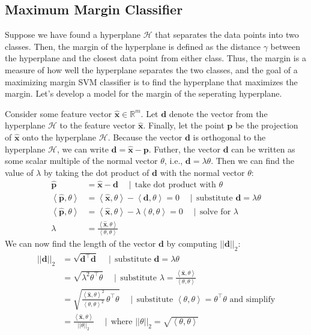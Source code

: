\documentclass{article}[11pt]
\def\R{\mathbb{R}}
\newcommand{\norm}[1]{\left|\left|#1\right|\right|}
\begin{document}
\subsection{Maximum Margin Classifier}
Suppose we have found a hyperplane $\mathcal{H}$ that separates the data points into two classes.
Then, the margin of the hyperplane is defined as the distance $\gamma$ between the hyperplane and the closest data point from either class.
Thus, the margin is a measure of how well the hyperplane separates the two classes, and the goal of a maximizing margin SVM classifier is to find the hyperplane that maximizes the margin.
Let's develop a model for the margin of the seperating hyperplane.

Consider some feature vector $\hat{\mathbf{x}} \in \R^{m}$. Let $\mathbf{d}$ denote the vector from the hyperplane $\mathcal{H}$ to the feature vector $\hat{\mathbf{x}}$.
Finally, let the point $\mathbf{p}$ be the projection of $\hat{\mathbf{x}}$ onto the hyperplane $\mathcal{H}$.
Because the vector $\mathbf{d}$ is orthogonal to the hyperplane $\mathcal{H}$, we can write $\mathbf{d} = \hat{\mathbf{x}} - \mathbf{p}$.
Futher, the vector $\mathbf{d}$ can be written as some scalar multiple of the normal vector $\theta$, i.e., $\mathbf{d} = \lambda \theta$.
Then we can find the value of $\lambda$ by taking the dot product of $\mathbf{d}$ with the normal vector $\theta$:
\begin{align*}
    \hat{\mathbf{p}} & = \hat{\mathbf{x}} - \mathbf{d}\quad\mid\,\text{take dot product with $\theta$} \\
    \left<\hat{\mathbf{p}},\theta\right> & = \left<\hat{\mathbf{x}},\theta\right> - \left<\mathbf{d},\theta\right> = 0\quad\mid\,\text{substitute $\mathbf{d} = \lambda \theta$} \\
    \left<\hat{\mathbf{p}},\theta\right> & = \left<\hat{\mathbf{x}},\theta\right> - \lambda \left<\theta,\theta\right> = 0\quad\mid\,\text{solve for $\lambda$} \\
    \lambda & = \frac{\left<\hat{\mathbf{x}},\theta\right>}{\left<\theta,\theta\right>}
\end{align*}
We can now find the length of the vector $\mathbf{d}$ by computing $\norm{\mathbf{d}}_{2}$:
\begin{align*}
    \norm{\mathbf{d}}_{2} & = \sqrt{\mathbf{d}^{\top}\mathbf{d}}\quad\mid\,\text{substitute $\mathbf{d} = \lambda \theta$} \\
    & = \sqrt{\lambda^{2}\theta^{\top}\theta}\quad\mid\,\text{substitute $\lambda = \frac{\left<\hat{\mathbf{x}},\theta\right>}{\left<\theta,\theta\right>}$} \\
    & = \sqrt{\frac{\left<\hat{\mathbf{x}},\theta\right>^{2}}{\left<\theta,\theta\right>^{2}}\,\theta^{\top}\theta}\quad\mid\, \text{substitute $\left<\theta,\theta\right> = \theta^{\top}\theta$ and simplify} \\
    & = \frac{\left<\hat{\mathbf{x}},\theta\right>}{\norm{\theta}_{2}}\quad\mid\,\text{where $\norm{\theta}_{2} = \sqrt{\left<\theta,\theta\right>}$}
\end{align*}
\end{document}
